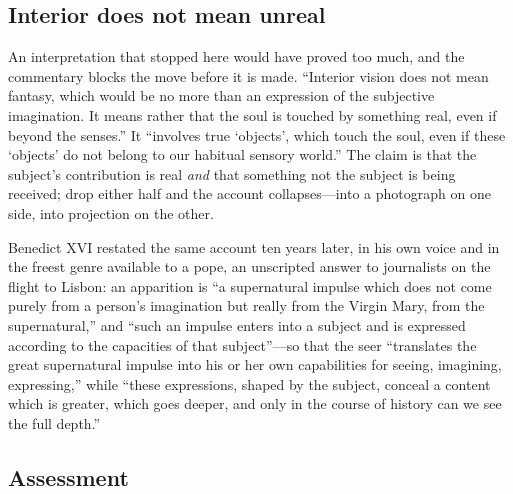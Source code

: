 \subsection{Interior does not mean unreal}

An interpretation that stopped here would have proved too much, and
the commentary blocks the move before it is made. ``Interior vision
does not mean fantasy, which would be no more than an expression of
the subjective imagination. It means rather that the soul is touched
by something real, even if beyond the senses.'' It ``involves true
`objects', which touch the soul, even if these `objects' do not
belong to our habitual sensory world.'' The claim is that the
subject's contribution is real \emph{and} that something not the
subject is being received; drop either half and the account
collapses---into a photograph on one side, into projection on the
other.

Benedict XVI restated the same account ten years later, in his own
voice and in the freest genre available to a pope, an unscripted
answer to journalists on the flight to Lisbon: an apparition is ``a
supernatural impulse which does not come purely from a person's
imagination but really from the Virgin Mary, from the supernatural,''
and ``such an impulse enters into a subject and is expressed
according to the capacities of that subject''---so that the seer
``translates the great supernatural impulse into his or her own
capabilities for seeing, imagining, expressing,'' while ``these
expressions, shaped by the subject, conceal a content which is
greater, which goes deeper, and only in the course of history can we
see the full depth.''

\subsection{Assessment}

